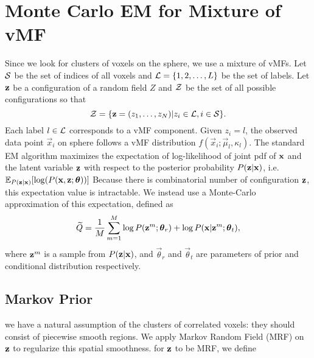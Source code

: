 \documentclass[runningheads,a4paper]{llncs}
\begin{document}
\section{Monte Carlo EM for Mixture of vMF}
\label{sec:mcem}
Since we look for clusters of voxels on the sphere, we use a mixture
of vMFs. Let $\mathcal{S}$ be the set of indices of all voxels and $\mathcal{L} = \{1,
2, \dots, L\}$ be the set of labels. Let $\text{\bf z}$ be a configuration
of a random field $Z$ and $\mathcal{Z}$ be the set of all possible
configurations so that
\begin{equation*}
  \mathcal{Z} = \{ \text{\bf z} = (z_1,\dots, z_N) | z_i \in \mathcal{L}, i \in \mathcal{S}\}.
\end{equation*}
Each label $l\in \mathcal{L}$ corresponds to a vMF component. Given $z_i = l$,
the observed data point $\vec x_i$ on sphere follows a vMF
distribution $f(\vec x_i; \vec \mu_l, \kappa_l)$. The standard EM
algorithm maximizes the expectation of log-likelihood of joint pdf of
$\text{\bf x}$ and the latent variable $\text{\bf z}$ with respect to the
posterior probability $P(\text{\bf z} | \text{\bf x})$, i.e. $\mathbb{E}_{P(\mat
  z| \mat x)} [\log (P(\mat x, \mat z; \vec \theta))]$ Because there
is combinatorial number of configuration $\text{\bf z}$, this expectation
value is intractable. We instead use a Monte-Carlo approximation of
this expectation, defined as
\begin{equation*}
  \widetilde Q = \frac{1}{M}\sum_{m=1}^{M} \log P(\mat z^m; \vec \theta_{r}) + \log P(\mat x | \mat z^m; \vec \theta_{t}), 
\label{eq:mcemq}
\end{equation*}
where $\text{\bf z}^m$ is a sample from $P(\text{\bf z} | \text{\bf x})$, and $\vec \theta_r$ and $\vec \theta_t$ are parameters of prior  and conditional distribution respectively.

\subsection{Markov Prior}
we have a natural assumption of the clusters of correlated voxels:
they should consist of piecewise smooth regions. We apply Markov Random
Field (MRF) on $\text{\bf z}$ to regularize this spatial smoothness. for $\text{\bf z}$ to be MRF, we define 
\end{document}
